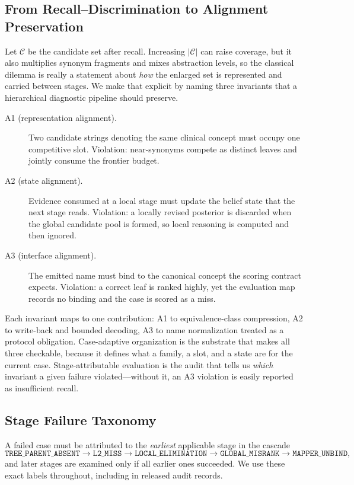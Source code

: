 \subsection{From Recall--Discrimination to Alignment Preservation}
\label{sec:dilemma}

Let $\mathcal{C}$ be the candidate set after recall.
Increasing $|\mathcal{C}|$ can raise coverage, but it also multiplies synonym fragments and mixes abstraction levels, so the classical dilemma is really a statement about \emph{how} the enlarged set is represented and carried between stages.
We make that explicit by naming three invariants that a hierarchical diagnostic pipeline should preserve.

\begin{description}
  \item[A1 (representation alignment).]
  Two candidate strings denoting the same clinical concept must occupy one competitive slot.
  Violation: near-synonyms compete as distinct leaves and jointly consume the frontier budget.
  \item[A2 (state alignment).]
  Evidence consumed at a local stage must update the belief state that the next stage reads.
  Violation: a locally revised posterior is discarded when the global candidate pool is formed, so local reasoning is computed and then ignored.
  \item[A3 (interface alignment).]
  The emitted name must bind to the canonical concept the scoring contract expects.
  Violation: a correct leaf is ranked highly, yet the evaluation map records no binding and the case is scored as a miss.
\end{description}

Each invariant maps to one contribution: A1 to equivalence-class compression, A2 to write-back and bounded decoding, A3 to name normalization treated as a protocol obligation.
Case-adaptive organization is the substrate that makes all three checkable, because it defines what a family, a slot, and a state are for the current case.
Stage-attributable evaluation is the audit that tells us \emph{which} invariant a given failure violated---without it, an A3 violation is easily reported as insufficient recall.

\subsection{Stage Failure Taxonomy}
\label{sec:taxonomy}

A failed case must be attributed to the \emph{earliest} applicable stage in the cascade
\[
\texttt{TREE\_PARENT\_ABSENT}
\rightarrow
\texttt{L2\_MISS}
\rightarrow
\texttt{LOCAL\_ELIMINATION}
\rightarrow
\texttt{GLOBAL\_MISRANK}
\rightarrow
\texttt{MAPPER\_UNBIND},
\]
and later stages are examined only if all earlier ones succeeded.
We use these exact labels throughout, including in released audit records.

